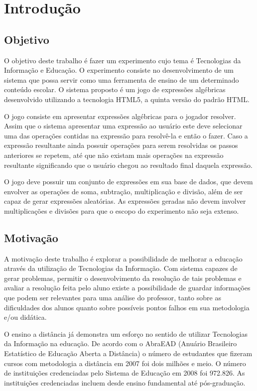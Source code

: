 \chapter*[Introdução]{Introdução}

\section{Objetivo}
O objetivo deste trabalho é fazer um experimento cujo tema é Tecnologias da Informação e Educação. O experimento consiste no desenvolvimento de um sistema que possa servir como uma ferramenta de ensino de um determinado conteúdo escolar. O sistema proposto é um jogo de expressões algébricas desenvolvido utilizando a tecnologia HTML5, a quinta versão do padrão HTML.

	O jogo consiste em apresentar expressões algébricas para o jogador resolver.
Assim que o sistema apresentar uma expressão ao usuário este deve selecionar uma das operações contidas na expressão para resolvê-la e então o fazer. Caso a expressão resultante ainda possuir operações para serem resolvidas os passos anteriores se repetem, até que não existam mais operações na expressão resultante significando que o usuário chegou ao resultado final daquela expressão.

	O jogo deve possuir um conjunto de expressões em sua base de dados, que devem envolver as operações de soma, subtração, multiplicação e divisão, além de ser capaz de gerar expressões aleatórias. As expressões geradas não devem involver multiplicações e divisões para que o escopo do experimento não seja extenso.

\section{Motivação}
A motivação deste trabalho é explorar a possibilidade de melhorar a educação através da utilização de Tecnologias da Informação. Com sistema capazes de gerar problemas, permitir o desenvolvimento da resolução de tais problemas e avaliar a resolução feita pelo aluno existe a possibilidade de guardar informações que podem ser relevantes para uma análise do professor, tanto sobre as dificuldades dos alunos quanto sobre possíveis pontos falhos em sua metodologia e/ou didática.
	
	O ensino a distância já demonstra um esforço no sentido de utilizar Tecnologias da Informação na educação. De acordo com o AbraEAD (Anuário Brasileiro Estatístico de Educação Aberta a Distância) o número de estudantes que fizeram cursos com metodologia a distância em 2007 foi dois milhões e meio. O número de instituições credenciadas pelo Sistema de Educação em 2008 foi 972.826. As instituições credenciadas incluem desde ensino fundamental até pós-graduação. \cite{eadBr}

